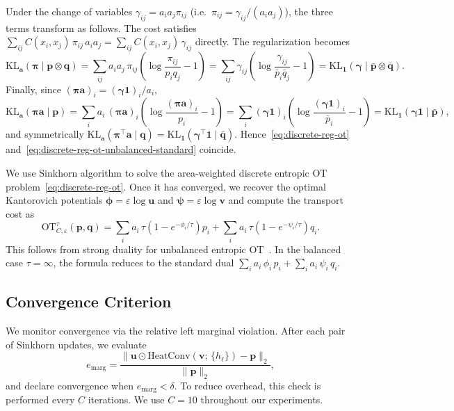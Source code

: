 \documentclass{article}
\theoremstyle{plain}
\theoremstyle{definition}
\theoremstyle{remark}
\renewcommand{\vector}[1]{\mathrm{\mathbf{#1}}}
\begin{document}
Under the change of variables $\gamma_{ij} = a_i a_j \pi_{ij}$
(i.e.\ $\pi_{ij} = \gamma_{ij}/(a_i a_j)$), the three terms transform as follows.
The cost satisfies $\sum_{ij} C(x_i,x_j)\,\pi_{ij}\,a_i a_j = \sum_{ij} C(x_i,x_j)\,\gamma_{ij}$ directly.
The regularization becomes
\[
\textrm{KL}_{\vector{a}}(\bm{\pi} \mid \vector{p}\otimes\vector{q})
= \sum_{ij}a_i a_j\,\pi_{ij}\left(\log\frac{\pi_{ij}}{p_i q_j} - 1\right)
= \sum_{ij}\gamma_{ij}\left(\log\frac{\gamma_{ij}}{\bar{p}_i\bar{q}_j} - 1\right)
= \textrm{KL}_{\mathbf{1}}(\bm{\gamma} \mid \bar{\vector{p}}\otimes\bar{\vector{q}}).
\]
Finally, since $(\bm{\pi}\vector{a})_i = (\bm{\gamma}\mathbf{1})_i/a_i$,
\[
\textrm{KL}_{\vector{a}}(\bm{\pi}\vector{a} \mid \vector{p})
= \sum_i a_i\,(\bm{\pi}\vector{a})_i\left(\log\frac{(\bm{\pi}\vector{a})_i}{p_i} - 1\right)
= \sum_i (\bm{\gamma}\mathbf{1})_i\left(\log\frac{(\bm{\gamma}\mathbf{1})_i}{\bar{p}_i} - 1\right)
= \textrm{KL}_{\mathbf{1}}(\bm{\gamma}\mathbf{1} \mid \bar{\vector{p}}),
\]
and symmetrically $\textrm{KL}_{\vector{a}}(\bm{\pi}^\top\vector{a} \mid \vector{q})
= \textrm{KL}_{\mathbf{1}}(\bm{\gamma}^\top\mathbf{1} \mid \bar{\vector{q}})$.
Hence~\eqref{eq:discrete-reg-ot} and~\eqref{eq:discrete-reg-ot-unbalanced-standard} coincide.


We use Sinkhorn algorithm to solve the area-weighted discrete entropic OT problem~\eqref{eq:discrete-reg-ot}. Once it has converged, we recover the optimal Kantorovich potentials $\vector{\phi} = \varepsilon \log \vector{u}$ and $\vector{\psi} = \varepsilon \log \vector{v}$ and compute the transport cost as
\begin{equation}
  \mathrm{OT}_{C,\varepsilon}^{\tau}(\vector{p}, \vector{q})
  = \sum_i a_i\, \tau\!\left(1 - e^{-\phi_i/\tau}\right) p_i
  + \sum_i a_i\, \tau\!\left(1 - e^{-\psi_i/\tau}\right) q_i.
\end{equation}
This follows from strong duality for unbalanced entropic OT~\cite{chizat2018scaling}. In the balanced case $\tau=\infty$, the formula reduces to the standard dual $\sum_i a_i\,\phi_i\,p_i + \sum_i a_i\,\psi_i\,q_i$.


\subsection{Convergence Criterion}\label{app:convergence_criterion}

We monitor convergence via the relative left marginal violation. After each pair of Sinkhorn updates, we evaluate
\begin{equation}
  e_{\mathrm{marg}} = \frac{\bigl\|\vector{u} \odot \mathrm{HeatConv}(\vector{v};\,\{h_\ell\}) - \vector{p}\bigr\|_2}{\|\vector{p}\|_2},
\end{equation}
and declare convergence when $e_{\mathrm{marg}} < \delta$. To reduce overhead, this check is performed every $C$ iterations. We use $C = 10$ throughout our experiments.
\end{document}
